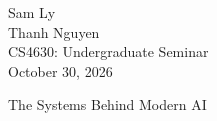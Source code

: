 \documentclass[12pt]{article}
\newcommand{\bibent}{\noindent \hangindent 40pt}
\newenvironment{workscited}{\newpage
  \begin{center} Works Cited
\end{center}}{\newpage }
\begin{document}
\begin{flushleft}

  Sam Ly\\
  Thanh Nguyen\\
  CS4630: Undergraduate Seminar\\
  October 30, 2026 \\

  \begin{center}
    The Systems Behind Modern AI
  \end{center}

  \setlength{\parindent}{0.5in}

  \begin{abstract}
    
  \end{abstract}












\end{flushleft}
\end{document}
